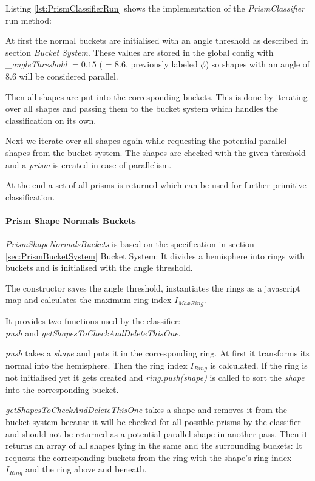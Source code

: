 \documentclass[../ClassicThesis.tex]{subfiles}
\begin{document}
Listing \ref{lst:PrismClassifierRun} shows the implementation of the \emph{PrismClassifier} run method:

At first the normal buckets are initialised with an angle threshold as described in section \emph{Bucket System}. These values are stored in the global config with \emph{\_angleThreshold} $ = 0.15 $  ( = 8.6\textdegree, previously labeled $\phi$) so shapes with an angle  of 8.6\textdegree \hspace{1pt} will be considered parallel.

Then all shapes are put into the corresponding buckets. This is done by iterating over all shapes and passing them to the bucket system which handles the classification on its own.

Next we iterate over all shapes again while requesting the potential parallel shapes from the bucket system. The shapes are checked with the given threshold and a \emph{prism} is created in case of parallelism.

At the end a set of all prisms is returned which can be used for further primitive classification.


\paragraph{Prism Shape Normals Buckets}

\emph{PrismShapeNormalsBuckets} is based on the specification in section \ref{sec:PrismBucketSystem} Bucket System: It divides a hemisphere into rings with buckets and is initialised with the angle threshold.

The constructor saves the angle threshold, instantiates the rings as a javascript map and calculates the maximum ring index $I_{MaxRing}$.

It provides two functions used by the classifier: \\
\emph{push} and \emph{getShapesToCheckAndDeleteThisOne}.

\emph{push} takes a \emph{shape} and puts it in the corresponding ring. At first it transforms its normal into the hemisphere. Then the ring index $ I_{Ring} $ is calculated. If the ring is not initialised yet it gets created and \emph{ring.push(shape)} is called to sort the \emph{shape} into the corresponding bucket.

\emph{getShapesToCheckAndDeleteThisOne} takes a shape and removes it from the bucket system because it will be checked for all possible prisms by the classifier and should not be returned as a potential parallel shape in another pass. Then it returns an array of all shapes lying in the same and the surrounding buckets: It requests the corresponding buckets from the ring with the shape's ring index $ I_{Ring} $ and the ring above and beneath.
\end{document}
